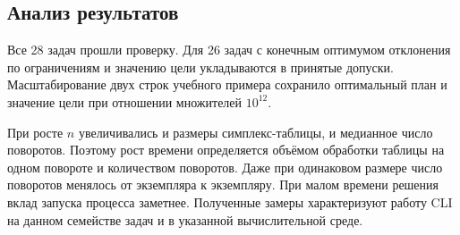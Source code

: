 \subsection{Анализ результатов}

Все 28 задач прошли проверку. Для 26 задач с конечным оптимумом отклонения
по ограничениям и значению цели укладываются в принятые допуски.
Масштабирование двух строк учебного примера сохранило оптимальный план
и значение цели при отношении множителей $10^{12}$.

При росте $n$ увеличивались и размеры симплекс-таблицы, и медианное число
поворотов. Поэтому рост времени определяется объёмом обработки таблицы
на одном повороте и количеством поворотов. Даже при одинаковом размере
число поворотов менялось от экземпляра к экземпляру. При малом времени
решения вклад запуска процесса заметнее. Полученные замеры характеризуют
работу CLI на данном семействе задач и в указанной вычислительной среде.
